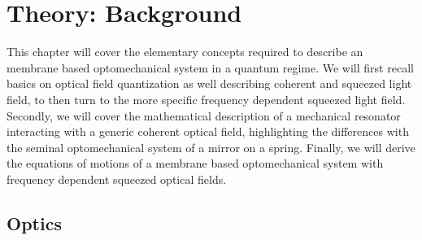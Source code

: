 \newcommand{\adag}[1]{\hat{a}_{#1}^\dagger}
\newcommand{\aop}[1]{\hat{a}_{#1\vphantom{\dagger}}}
\chapter{Theory: Background}
This chapter will cover the elementary concepts required to describe an membrane based optomechanical system in a quantum regime. We will first recall basics on optical field quantization as well describing coherent and squeezed light field, to then turn to the more specific frequency dependent squeezed light field. Secondly, we will cover the mathematical description of a mechanical resonator interacting with a generic coherent optical field, highlighting the differences with the seminal optomechanical system of a mirror on a spring. Finally, we will derive the equations of motions of a membrane based optomechanical system with frequency dependent squeezed optical fields. 
\minitoc
\newpage
\section{Optics}
